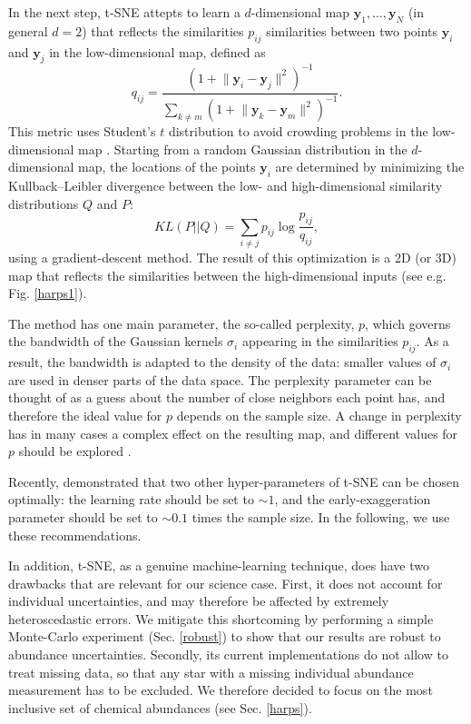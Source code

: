 \documentclass{aa}  %
\begin{document}
In the next step, t-SNE attepts to learn a $d$-dimensional map $\mathbf{y}_1, \dots, \mathbf{y}_N$ (in general $d=2$) that reflects the similarities  $p_{ij}$ similarities between two points $\mathbf{y}_i$ and $\mathbf{y}_j$ in the low-dimensional map, defined as
$$q_{ij} = \frac{(1 + \lVert \mathbf{y}_i - \mathbf{y}_j\rVert^2)^{-1}}{\sum_{k \neq m} (1 + \lVert \mathbf{y}_k - \mathbf{y}_m\rVert^2)^{-1}}.$$
This metric uses Student's $t$ distribution to avoid crowding problems in the low-dimensional map \citep{vanderMaaten2008}. Starting from a random Gaussian distribution in the $d$-dimensional map, the locations of the points $\mathbf{y}_i$ are determined by minimizing the Kullback–Leibler divergence \citep{Kullback1951} between the low- and high-dimensional similarity distributions $Q$ and $P$:
$$KL(P||Q) = \sum_{i \neq j} p_{ij} \log \frac{p_{ij}}{q_{ij}},$$
using a gradient-descent method. The result of this optimization is a 2D (or 3D) map that reflects the similarities between the high-dimensional inputs (see e.g. Fig. \ref{harps1}).

The method has one main parameter, the so-called perplexity, $p$, which governs the bandwidth of the Gaussian kernels $\sigma_i$ appearing in the similarities $p_{ij}$. As a result, the bandwidth is adapted to the density of the data: smaller values of $\sigma_i$ are used in denser parts of the data space. The perplexity parameter can be thought of as a guess about the number of close neighbors each point has, and therefore the ideal value for $p$ depends on the sample size. A change in perplexity has in many cases a complex effect on the resulting map, and different values for $p$ should be explored \citep{Wattenberg2016}. 

Recently, \citet{Linderman2017} demonstrated that two other hyper-parameters of t-SNE can be chosen optimally: the learning rate should be set to $\sim 1$, and the early-exaggeration parameter should be set to $\sim 0.1$ times the sample size. In the following, we use these recommendations.

In addition, t-SNE, as a genuine machine-learning technique, does have two drawbacks that are relevant for our science case. First, it does not account for individual uncertainties, and may therefore be affected by extremely heteroscedastic errors. We mitigate this shortcoming by performing a simple Monte-Carlo experiment (Sec. \ref{robust}) to show that our results are robust to abundance uncertainties. Secondly, its current implementations do not allow to treat missing data, so that any star with a missing individual abundance measurement has to be excluded. We therefore decided to focus on the most inclusive set of chemical abundances (see Sec. \ref{harps}).
\end{document}
